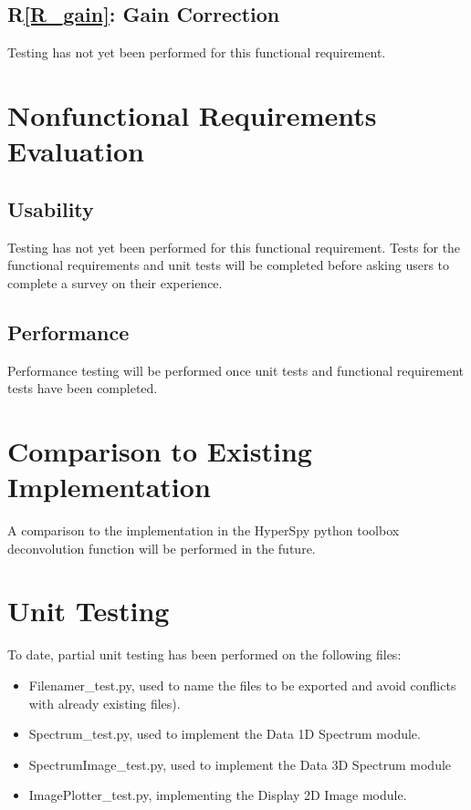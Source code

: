 \documentclass[12pt, titlepage]{article}
\newcommand{\rref}[1]{R\ref{#1}}
\begin{document}
\subsection{\rref{R_gain}: Gain Correction}
Testing has not yet been performed for this functional requirement.

\section{Nonfunctional Requirements Evaluation}

\subsection{Usability}
Testing has not yet been performed for this functional requirement. Tests for
the functional requirements and unit tests will be completed before asking users
to complete a survey on their experience.

\subsection{Performance}
Performance testing will be performed once unit tests and functional requirement
tests have been completed.

\section{Comparison to Existing Implementation}	
A comparison to the implementation in the HyperSpy python toolbox deconvolution
function will be performed in the future.

\section{Unit Testing}
\label{sec:UnitTest}
To date, partial unit testing has been performed on the following files:
\begin{itemize}
    \item Filenamer\_test.py, used to name the files to be exported and avoid
    conflicts with already existing files).
    \item Spectrum\_test.py, used to implement the Data 1D Spectrum module.
    \item SpectrumImage\_test.py, used to implement the Data 3D Spectrum module
    \item ImagePlotter\_test.py, implementing the Display 2D Image module.
\end{itemize}
\end{document}
